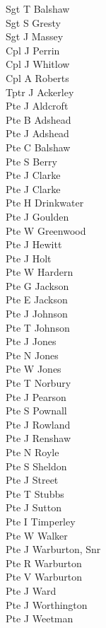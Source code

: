 \begin{multicols}{2}
  Sgt T Balshaw \\
  Sgt S Gresty \\
  Sgt J Massey \\
  Cpl J Perrin \\
  Cpl J Whitlow \\
  Cpl A Roberts \\
  Tptr J Ackerley \\
  Pte J Aldcroft \\
  Pte B Adshead \\
  Pte J Adshead \\
  Pte C Balshaw \\
  Pte S Berry \\
  Pte J Clarke \\
  Pte J Clarke \\
  Pte H Drinkwater \\
  Pte J Goulden \\
  Pte W Greenwood \\
  Pte J Hewitt \\
  Pte J Holt \\
  Pte W Hardern \\
  Pte G Jackson \\
  Pte E Jackson \\
  Pte J Johnson \\
  Pte T Johnson \\
  Pte J Jones \\
  Pte N Jones \\
  Pte W Jones \\
  Pte T Norbury \\
  Pte J Pearson \\
  Pte S Pownall \\
  Pte J Rowland \\
  Pte J Renshaw \\
  Pte N Royle \\
  Pte S Sheldon \\
  Pte J Street \\
  Pte T Stubbs \\
  Pte J Sutton \\
  Pte I Timperley \\
  Pte W Walker \\
  Pte J Warburton, Snr \\
  Pte R Warburton \\
  Pte V Warburton \\
  Pte J Ward \\
  Pte J Worthington \\
  Pte J Weetman \\
\end{multicols}

